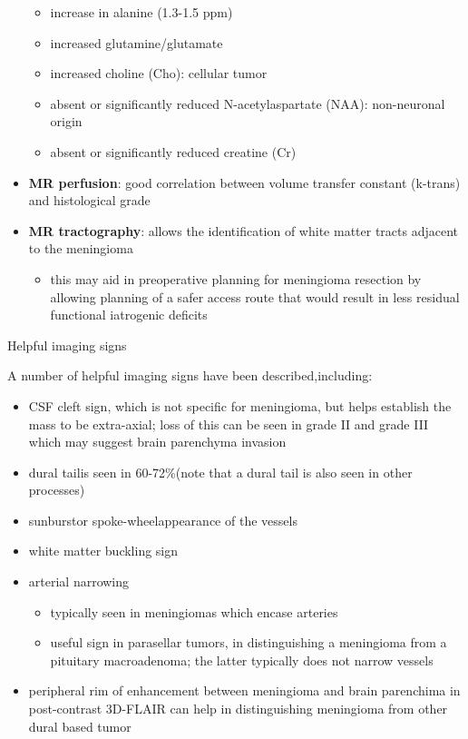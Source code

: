 \begin{itemize}
	\begin{itemize}
		\item
		increase in alanine (1.3-1.5 ppm)
		\item
		increased glutamine/glutamate
		\item
		increased choline (Cho): cellular tumor
		\item
		absent or significantly reduced N-acetylaspartate (NAA): non-neuronal origin
		\item
		absent or significantly reduced creatine (Cr)
	\end{itemize}
	\item
	\textbf{MR perfusion}: \textbf{} good correlation between volume transfer constant (k-trans) and histological grade 
	\item
	\textbf{MR tractography}: allows the identification of white matter tracts adjacent to the meningioma
	
	\begin{itemize}
		\item
		this may aid in preoperative planning for meningioma resection by allowing planning of a safer access route that would result in less residual functional iatrogenic deficits\hspace{0pt}
	\end{itemize}
\end{itemize}

Helpful imaging signs

A number of helpful imaging signs have been described,including:

\begin{itemize}
	\item
	CSF cleft sign, which is not specific for meningioma, but helps establish the mass to be extra-axial; loss of this can be seen in grade II and grade III which may suggest brain parenchyma invasion
	\item
	dural tailis seen in 60-72\%(note that a dural tail is also seen in other processes)
	\item
	sunburstor spoke-wheelappearance of the vessels
	\item
	white matter buckling sign
	\item
	arterial narrowing
	
	\begin{itemize}
		\item
		typically seen in meningiomas which encase arteries
		\item
		useful sign in parasellar tumors, in distinguishing a meningioma from a pituitary macroadenoma; the latter typically does not narrow vessels
	\end{itemize}
	\item
	peripheral rim of enhancement between meningioma and brain parenchima in post-contrast 3D-FLAIR can help in distinguishing meningioma from other dural based tumor
\end{itemize}

